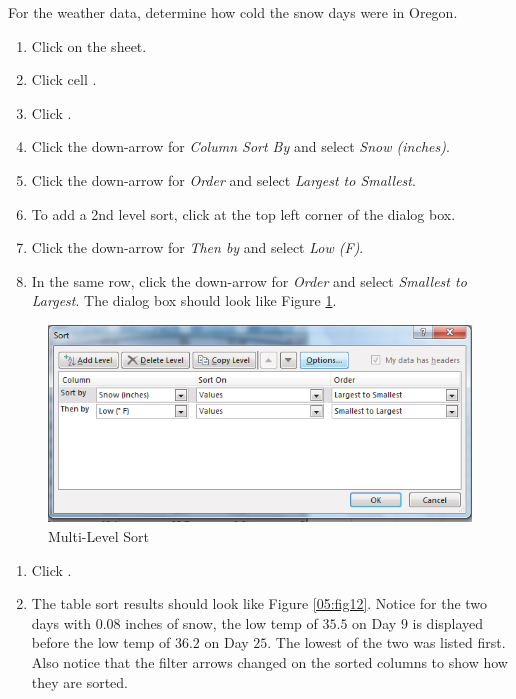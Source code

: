 For the weather data, determine how cold the snow days were in Oregon.

\begin{enumerate}
	\item Click on the  sheet.
	\item Click cell .
	\item Click .
	\item Click the down-arrow for \textit{Column Sort By} and select \textit{Snow (inches)}.
	\item Click the down-arrow for \textit{Order} and select \textit{Largest to Smallest}.
	\item To add a 2nd level sort, click  at the top left corner of the dialog box.
	\item Click the down-arrow for \textit{Then by} and select \textit{Low (\textdegree F)}.
	\item In the same row, click the down-arrow for \textit{Order} and select \textit{Smallest to Largest}. The dialog box should look like Figure \ref{05:fig11}.
\end{enumerate}

\begin{figure}[H]
	\centering
	\includegraphics[width=\maxwidth{.95\linewidth}]{gfx/ch05_fig11}
	\caption{Multi-Level Sort}
	\label{05:fig11}
\end{figure}

\begin{enumerate}[resume]
	\item Click .
	\item The table sort results should look like Figure \ref{05:fig12}. Notice for the two days with $ 0.08 $ inches of snow, the low temp of $ 35.5 $ on Day $ 9 $ is displayed before the low temp of $ 36.2 $ on Day $ 25 $. The lowest of the two was listed first. Also notice that the filter arrows changed on the sorted columns to show how they are sorted.
\end{enumerate}

